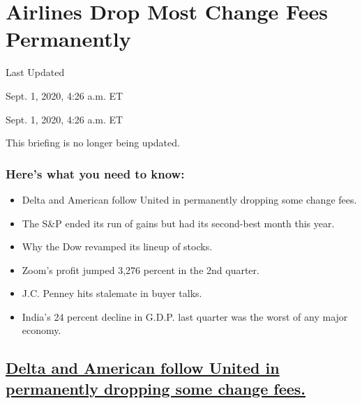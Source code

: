 \hypertarget{airlines-drop-most-change-fees-permanently}{%
\section{Airlines Drop Most Change Fees
Permanently}\label{airlines-drop-most-change-fees-permanently}}

Last Updated

Sept. 1, 2020, 4:26 a.m. ET

Sept. 1, 2020, 4:26 a.m. ET

This briefing is no longer being updated.

\hypertarget{heres-what-you-need-to-know}{%
\subsubsection{Here's what you need to
know:}\label{heres-what-you-need-to-know}}

\begin{itemize}
\item
  \protect\hyperlink{delta-and-american-follow-united-in-permanently-dropping-some-change-fees}{}

  Delta and American follow United in permanently dropping some change
  fees.
\item
  \protect\hyperlink{the-sp-ended-its-run-of-gains-but-had-its-second-best-month-this-year}{}

  The S\&P ended its run of gains but had its second-best month this
  year.
\item
  \protect\hyperlink{why-the-dow-revamped-its-lineup-of-stocks}{}

  Why the Dow revamped its lineup of stocks.
\item
  \protect\hyperlink{zooms-profit-jumped-3276-percent-in-the-2nd-quarter}{}

  Zoom's profit jumped 3,276 percent in the 2nd quarter.
\item
  \protect\hyperlink{jc-penney-hits-stalemate-in-buyer-talks}{}

  J.C. Penney hits stalemate in buyer talks.
\item
  \protect\hyperlink{indias-24-percent-decline-in-gdp-last-quarter-was-the-worst-of-any-major-economy}{}

  India's 24 percent decline in G.D.P. last quarter was the worst of any
  major economy.
\end{itemize}

\hypertarget{delta-and-american-follow-united-in-permanently-dropping-some-change-fees}{%
\subsection{\texorpdfstring{\protect\hyperlink{delta-and-american-follow-united-in-permanently-dropping-some-change-fees}{Delta
and American follow United in permanently dropping some change
fees.}}{Delta and American follow United in permanently dropping some change fees.}}\label{delta-and-american-follow-united-in-permanently-dropping-some-change-fees}}

